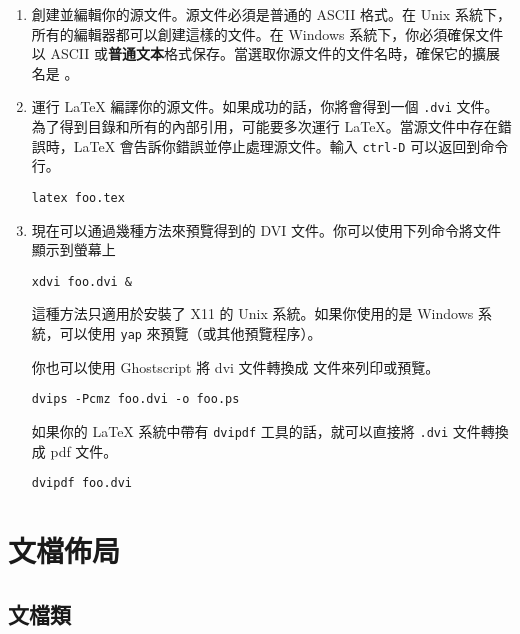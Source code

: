 \begin{enumerate}
\item
創建並編輯你的源文件。源文件必須是普通的 ASCII 格式。在 Unix 系統下，所有的編輯器都可以創建這樣的文件。在 Windows 系統下，你必須確保文件以 ASCII 或\textbf{普通文本}格式保存。當選取你源文件的文件名時，確保它的擴展名是 。
\item
運行 \LaTeX{} 編譯你的源文件。如果成功的話，你將會得到一個 \texttt{.dvi} 文件。為了得到目錄和所有的內部引用，可能要多次運行 \LaTeX{}。當源文件中存在錯誤時，\LaTeX{} 會告訴你錯誤並停止處理源文件。輸入 \texttt{ctrl-D} 可以返回到命令行。
\begin{lscommand}
\verb+latex foo.tex+
\end{lscommand}
\item
現在可以通過幾種方法來預覽得到的 DVI 文件。你可以使用下列命令將文件顯示到螢幕上
\begin{lscommand}
\verb+xdvi foo.dvi &+
\end{lscommand}
這種方法只適用於安裝了 X11 的 Unix 系統。如果你使用的是 Windows 系統，可以使用 \texttt{yap} 來預覽（或其他預覽程序）。

你也可以使用 Ghostscript 將 dvi 文件轉換成 \PSi{} 文件來列印或預覽。
\begin{lscommand}
\verb+dvips -Pcmz foo.dvi -o foo.ps+
\end{lscommand}
如果你的 \LaTeX{} 系統中帶有 \texttt{dvipdf} 工具的話，就可以直接將 \texttt{.dvi} 文件轉換成 pdf 文件。
\begin{lscommand}
\verb+dvipdf foo.dvi+
\end{lscommand}
\end{enumerate}

\section{文檔佈局}

\subsection{文檔類}\label{sec:documentclass}

